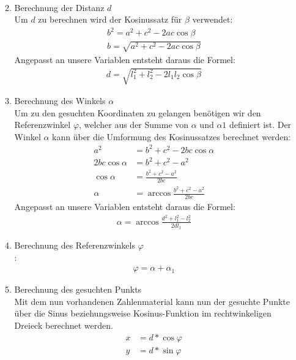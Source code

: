 \begin{itemize}
\begin{enumerate}
\begin{align*}
\end{align*}
\item Berechnung der Distanz $d$\\
Um $d$ zu berechnen wird der Kosinussatz für $\beta$ verwendet:
\begin{align*}
b^2 = a^2+c^2-2ac\cos\beta \\
b = \sqrt{a^2+c^2-2ac\cos\beta}
\end{align*}
Angepasst an unsere Variablen entsteht daraus die Formel:
\begin{align*}
d = \sqrt{l_1^2+l_2^2-2l_1l_2\cos\beta}
\end{align*}
\item Berechnung des Winkels $\alpha$\\
Um zu den gesuchten Koordinaten zu gelangen benötigen wir den Referenzwinkel $\varphi$, welcher aus der Summe von $\alpha$ und $\alpha1$ definiert ist. Der Winkel $\alpha$ kann über die Umformung des Kosinussatzes berechnet werden:
\begin{align*}
a^2 & = b^2 + c^2 - 2bc \cos \alpha \\
2bc \cos \alpha & = b^2 + c^2 - a^2 \\
\cos \alpha & = \frac{b^2 + c^2 - a^2}{2bc} \\
\alpha & = \arccos \frac{b^2 + c^2 - a^2}{2bc}
\end{align*}
Angepasst an unsere Variablen entsteht daraus die Formel:
\begin{align*}
\alpha = \arccos \frac{d^2 + l_1^2 - l_2^2}{2dl_1}
\end{align*}
\item Berechnung des Referenzwinkels $\varphi$\\:
\begin{align*}
\varphi = \alpha + \alpha_1
\end{align*}
\item Berechnung des gesuchten Punkts\\
Mit dem nun vorhandenen Zahlenmaterial kann nun der gesuchte Punkte über die Sinus beziehungsweise Kosinus-Funktion im rechtwinkeligen Dreieck berechnet werden.
\begin{align*}
x &= d * \cos \varphi \\
y &= d * \sin \varphi
\end{align*}
\end{enumerate}


\end{itemize}
